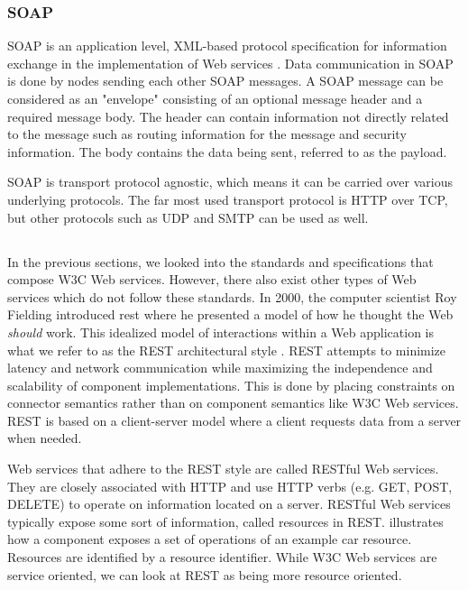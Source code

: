 \subsubsection{SOAP}

SOAP is an application level, XML-based protocol specification for information
exchange in the implementation of Web services \cite{w3c-soap}. Data
communication in SOAP is done by nodes sending each other SOAP messages. A SOAP
message can be considered as an "envelope" consisting of an optional message
header and a required message body. The header can contain information not
directly related to the message such as routing information for the message and
security information. The body contains the data being sent, referred to as the
payload.

SOAP is transport protocol agnostic, which means it can be carried over various
underlying protocols. The far most used transport protocol is HTTP over TCP, but
other protocols such as UDP and SMTP can be used as well.

\subsection{}
\label{rest}

In the previous sections, we looked into the standards and specifications that
compose W3C Web services. However, there also exist other types of Web services
which do not follow these standards. In 2000, the computer scientist Roy
Fielding introduced \gls{rest} where he presented a model of how he thought the
Web \textit{should} work. This idealized model of interactions within a Web
application is what we refer to as the REST architectural style
\cite{rest-fielding}. REST attempts to minimize latency and network
communication while maximizing the independence and scalability of component
implementations. This is done by placing constraints on connector semantics
rather than on component semantics like W3C Web services.  REST is based on a
client-server model where a client requests data from a server when needed.

Web services that adhere to the REST style are called RESTful Web services. They
are closely associated with HTTP and use HTTP verbs (e.g. GET, POST, DELETE) to
operate on information located on a server. RESTful Web services typically
expose some sort of information, called resources in REST. 
illustrates how a component exposes a set of operations of an example car
resource. Resources are identified by a resource identifier. While W3C Web
services are service oriented, we can look at REST as being more resource
oriented.

